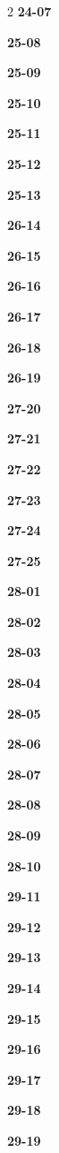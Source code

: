 \documentclass[10pt,a4paper]{article}
\begin{document}
\begin{multicols}{2}
\noindent\textbf{24-07}\ \par
\noindent\textbf{25-08}\ \par
\noindent\textbf{25-09}\ \par
\noindent\textbf{25-10}\ \par
\noindent\textbf{25-11}\ \par
\noindent\textbf{25-12}\ \par
\noindent\textbf{25-13}\ \par
\noindent\textbf{26-14}\ \par
\noindent\textbf{26-15}\ \par
\noindent\textbf{26-16}\ \par
\noindent\textbf{26-17}\ \par
\noindent\textbf{26-18}\ \par
\noindent\textbf{26-19}\ \par
\noindent\textbf{27-20}\ \par
\noindent\textbf{27-21}\ \par
\noindent\textbf{27-22}\ \par
\noindent\textbf{27-23}\ \par
\noindent\textbf{27-24}\ \par
\noindent\textbf{27-25}\ \par
\noindent\textbf{28-01}\ \par
\noindent\textbf{28-02}\ \par
\noindent\textbf{28-03}\ \par
\noindent\textbf{28-04}\ \par
\noindent\textbf{28-05}\ \par
\noindent\textbf{28-06}\ \par
\noindent\textbf{28-07}\ \par
\noindent\textbf{28-08}\ \par
\noindent\textbf{28-09}\ \par
\noindent\textbf{28-10}\ \par
\noindent\textbf{29-11}\ \par
\noindent\textbf{29-12}\ \par
\noindent\textbf{29-13}\ \par
\noindent\textbf{29-14}\ \par
\noindent\textbf{29-15}\ \par
\noindent\textbf{29-16}\ \par
\noindent\textbf{29-17}\ \par
\noindent\textbf{29-18}\ \par
\noindent\textbf{29-19}\ \par

\end{multicols}
\end{document}

